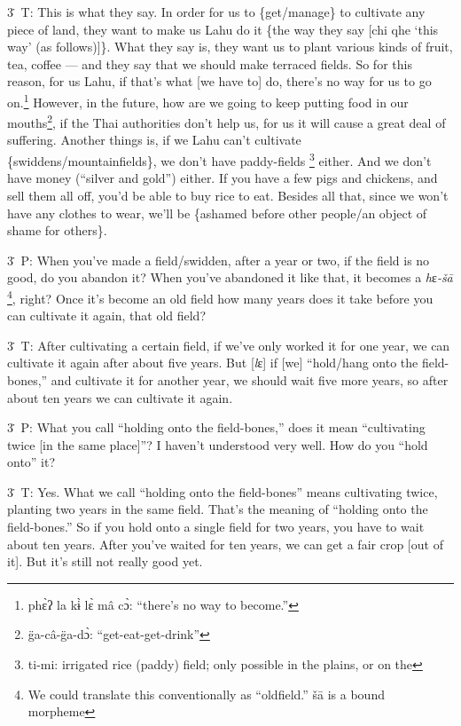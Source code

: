 3\. T: This is what they say. In order for us to \{get/manage\} to cultivate any
piece of land, they want to make us Lahu do it \{the way they say [chi qhe `this
way' (as follows)]\}. What they say is, they want us to plant various kinds of
fruit, tea, coffee --- and they say that we should make terraced fields. So for
this reason, for us Lahu, if that's what [we have to] do, there's no way for us
to go on.\footnote{phɛ̀ʔ la kɨ̀ lɛ̀ mâ cɔ̀: ``there's no way to become.''} However, in the future, how are we going to keep putting food in
our mouths\footnote{g̈a-câ-g̈a-dɔ̀: ``get-eat-get-drink''}, if the Thai authorities don't help us, for us it will cause a great
deal of suffering. Another things is, if we Lahu can't cultivate \{swiddens/mountainfields\},
we don't have paddy-fields \footnote{ti-mi: irrigated rice (paddy) field; only possible in the plains, or on the} either. And we don't have money (``silver and gold'')
either. If you have a few pigs and chickens, and sell them all off, you'd be able
to buy rice to eat. Besides all that, since we won't have any clothes to wear,
we'll be \{ashamed before other people/an object of shame for others\}.

3\. P: When you've made a field/swidden, after a year or two, if the field is no
good, do you abandon it? When you've abandoned it like that, it becomes a \textit{h}ɛ\textit{-šā
}\footnote{We could translate this conventionally as ``oldfield.'' šā is a bound morpheme}, right? Once it's become an old field how many years does it take before
you can cultivate it again, that old field?

3\. T: After cultivating a certain field, if we've only worked it for one year,
we can cultivate it again after about five years. But [\textit{l}ɛ] if [we] ``hold/hang
onto the field-bones,'' and cultivate it for another year, we should wait five
more years, so after about ten years we can cultivate it again.

3\. P: What you call ``holding onto the field-bones,'' does it mean ``cultivating
twice [in the same place]''? I haven't understood very well. How do you ``hold
onto'' it?

3\. T: Yes. What we call ``holding onto the field-bones'' means cultivating twice,
planting two years in the same field. That's the meaning of ``holding onto the
field-bones.'' So if you hold onto a single field for two years, you have to wait
about ten years. After you've waited for ten years, we can get a fair crop [out
of it]. But it's still not really good yet.

